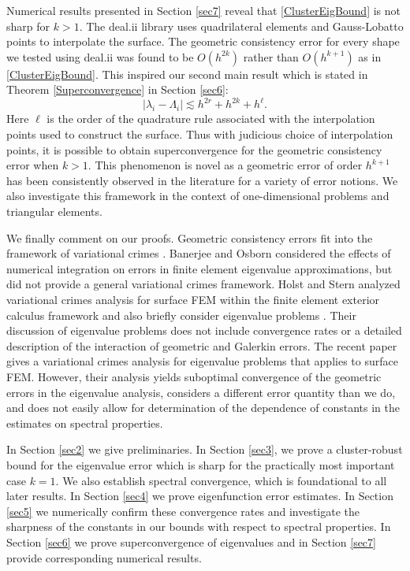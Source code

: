 \documentclass{siamart0516}
\numberwithin{equation}{section}
\numberwithin{theorem}{section}
\numberwithin{figure}{section}
\begin{document}
Numerical results presented in Section \ref{sec7} reveal that \eqref{ClusterEigBound} is not sharp for $k>1$. The deal.ii library \cite{BHK:07} uses quadrilateral elements and Gauss-Lobatto points to interpolate the surface. The geometric consistency error for every shape we tested using deal.ii was found to be $O(h^{2k})$ rather than $O(h^{k+1})$ as in \eqref{ClusterEigBound}. This inspired our second main result which is stated in Theorem \ref{Superconvergence} in Section \ref{sec6}:
\begin{equation*}
|\lambda_i-\Lambda_i|\lesssim h^{2r} + h^{2k} + h^\ell.
\end{equation*}
Here $\ell$ is the order of the quadrature rule associated with the interpolation points used to construct the surface. Thus with judicious choice of interpolation points, it is possible to obtain superconvergence for the geometric consistency error when $k>1$. This phenomenon is novel as a geometric error of order $h^{k+1}$ has been consistently observed in the literature for a variety of error notions. We also investigate this framework in the context of one-dimensional problems and triangular elements. 

We finally comment on our proofs.  Geometric consistency errors fit into the framework of variational crimes \cite{SF73}.  Banerjee and Osborn \cite{BO90, Ban92} considered the effects of numerical integration on errors in finite element eigenvalue approximations, but did not provide a general variational crimes framework. Holst and Stern analyzed variational crimes analysis for surface FEM within the finite element exterior calculus framework and also briefly consider eigenvalue problems \cite{HoSt2012}.  Their discussion of eigenvalue problems does not include convergence rates or a detailed description of the interaction of geometric and Galerkin errors. The recent paper \cite{CEM14} gives a variational crimes analysis for eigenvalue problems that applies to surface FEM.  However, their analysis yields suboptimal convergence of the geometric errors in the eigenvalue analysis, considers a different error quantity than we do, and does not easily allow for determination of the dependence of constants in the estimates on spectral properties.  

In Section \ref{sec2} we give preliminaries. In Section \ref{sec3}, we prove a cluster-robust bound for the eigenvalue error which is sharp for the practically most important case $k=1$.  We also establish spectral convergence, which is foundational to all later results.  In Section \ref{sec4} we prove eigenfunction error estimates.  In Section \ref{sec5} we numerically confirm these convergence rates %
and investigate the sharpness of the constants in our bounds with respect to spectral properties.   In Section \ref{sec6} we prove superconvergence of eigenvalues and in Section \ref{sec7} provide corresponding numerical results.  
\end{document}
